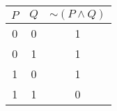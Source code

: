 \begin{tabular}{|c|c||c|}
\hline
$ P $ & $ Q $ & $  \sim (P \wedge Q) $ \\
\hline
0 & 0 & 1 \\
0 & 1 & 1 \\
1 & 0 & 1 \\
1 & 1 & 0 \\
\hline
\end{tabular}
\label{table:tt1}
